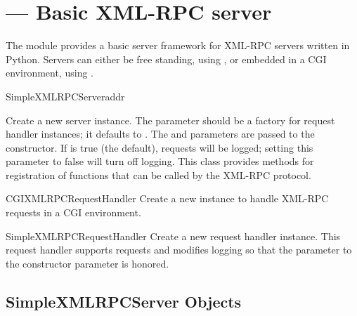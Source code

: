 \section{ ---
         Basic XML-RPC server}



The  module provides a basic server
framework for XML-RPC servers written in Python.  Servers can either
be free standing, using , or embedded in a
CGI environment, using .

\begin{classdesc}{SimpleXMLRPCServer}{addr}

  Create a new server instance.  The  parameter
  should be a factory for request handler instances; it defaults to
  .  The  and
   parameters are passed to the
   constructor.  If
   is true (the default), requests will be logged;
  setting this parameter to false will turn off logging.  This class
  provides methods for registration of functions that can be called by
  the XML-RPC protocol.
\end{classdesc}

\begin{classdesc}{CGIXMLRPCRequestHandler}{}
  Create a new instance to handle XML-RPC requests in a CGI
  environment. 
\end{classdesc}

\begin{classdesc}{SimpleXMLRPCRequestHandler}{}
  Create a new request handler instance.  This request handler
  supports  requests and modifies logging so that the
   parameter to the 
  constructor parameter is honored.
\end{classdesc}


\subsection{SimpleXMLRPCServer Objects \label{simple-xmlrpc-servers}}

